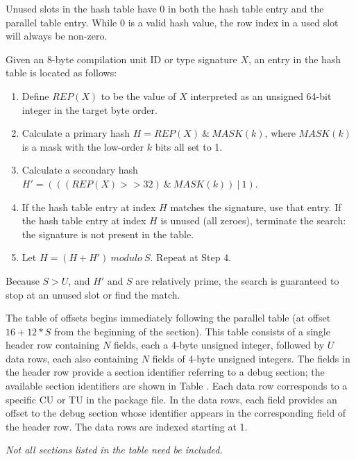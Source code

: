Unused slots in the hash table have 0 in both the hash table
entry and the parallel table entry. While 0 is a valid hash
value, the row index in a used slot will always be non-zero.

Given an 8-byte compilation unit ID or type signature $X$,
an entry in the hash table is located as follows:
\begin{enumerate}[1. ]
\item Define $REP(X)$ to be the value of $X$ interpreted as an 
      unsigned 64-bit integer in the target byte order.
\item Calculate a primary hash $H = REP(X)\ \&\ MASK(k)$, where
      $MASK(k)$ is a mask with the low-order $k$ bits all set to 1.
\item Calculate a secondary hash $H' = (((REP(X)>>32)\ \&\ MASK(k))\ |\ 1)$.
\item If the hash table entry at index $H$ matches the signature, use
      that entry. If the hash table entry at index $H$ is unused (all
      zeroes), terminate the search: the signature is not present
      in the table.
\item Let $H = (H + H')\ modulo\ S$. Repeat at Step 4.
\end{enumerate}

Because $S > U$, and $H'$ and $S$ are relatively prime, the search is
guaranteed to stop at an unused slot or find the match.

The table of offsets begins immediately following the parallel
table (at offset \mbox{$16 + 12 * S$} from the beginning of the section).
This table consists of a single header row containing $N$ fields,
each a 4-byte unsigned integer, followed by $U$ data rows, each
also containing $N$ fields of 4-byte unsigned integers. The fields
in the header row provide a section identifier referring to a
debug section; the available section identifiers are shown in
Table . 
Each data row corresponds to a specific CU
or TU in the package file. In the data rows, each field provides
an offset to the debug section whose identifier appears in the
corresponding field of the header row. The data rows are indexed
starting at 1.

\textit{Not all sections listed in the table need be included.}

